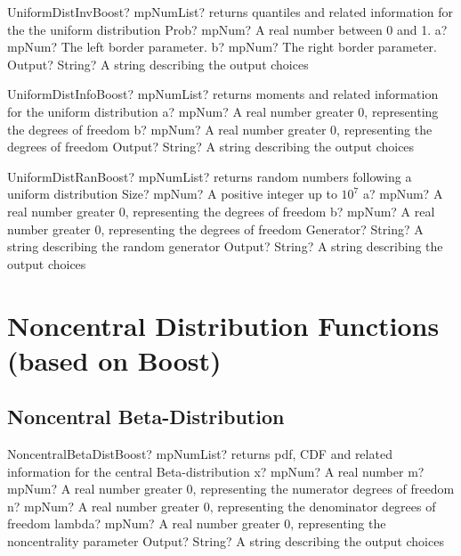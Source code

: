 \documentclass[12pt,a4paper,openany]{book}
\begin{document}
\begin{mpFunctionsExtract}
\mpFunctionFour
{UniformDistInvBoost? mpNumList? returns quantiles and related information for the the uniform distribution}
{Prob? mpNum? A real number between 0 and 1.}
{a? mpNum? The left border parameter.}
{b? mpNum? The right border parameter.}
{Output? String? A string describing the output choices}
\end{mpFunctionsExtract}

\begin{mpFunctionsExtract}
\mpFunctionThree
{UniformDistInfoBoost? mpNumList? returns moments and related information for the uniform distribution}
{a? mpNum? A real number greater 0, representing the degrees of freedom}
{b? mpNum? A real number greater 0, representing the degrees of freedom}
{Output? String? A string describing the output choices}
\end{mpFunctionsExtract}

\begin{mpFunctionsExtract}
\mpFunctionFive
{UniformDistRanBoost? mpNumList? returns random numbers following a uniform distribution}
{Size? mpNum? A positive integer up to $10^7$}
{a? mpNum? A real number greater 0, representing the degrees of freedom}
{b? mpNum? A real number greater 0, representing the degrees of freedom}
{Generator? String? A string describing the random generator}
{Output? String? A string describing the output choices}
\end{mpFunctionsExtract}

\chapter{Noncentral Distribution Functions (based on Boost)}

\section{Noncentral Beta-Distribution}

\begin{mpFunctionsExtract}
\mpFunctionFive
{NoncentralBetaDistBoost? mpNumList? returns pdf, CDF and related information for the central Beta-distribution}
{x? mpNum? A real number}
{m? mpNum? A real number greater 0, representing the numerator  degrees of freedom}
{n? mpNum? A real number greater 0, representing the denominator degrees of freedom}
{lambda? mpNum? A real number greater 0, representing the noncentrality parameter}
{Output? String? A string describing the output choices}
\end{mpFunctionsExtract}
\end{document}
